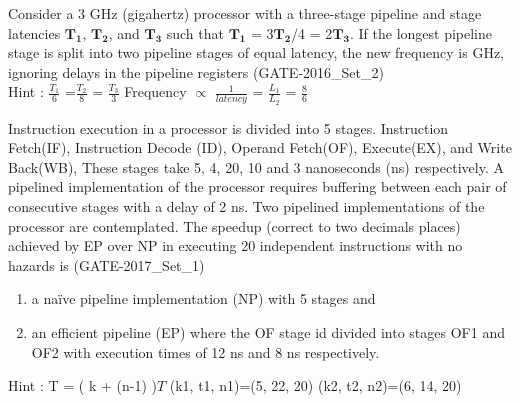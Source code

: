 \begin{questyle}
  \question  Consider a 3 GHz (gigahertz) processor with a three-stage pipeline and stage latencies
             \( \boldsymbol {T_1} \), \( \boldsymbol {T_2} \), and \( \boldsymbol {T_3} \) such that
             \( \boldsymbol {T_1} \) = 3\( \boldsymbol {T_2}\)/4 = 2\( \boldsymbol {T_3} \). If the
             longest pipeline stage is split into two pipeline stages of equal latency, the new frequency
             is \fillin[4] GHz, ignoring delays in the pipeline registers (GATE-2016\_Set\_2)\\

             Hint : {\Large\(\frac{T_1}{6}\)} ={\Large\(\frac{T_2}{8}\)} = {\Large\(\frac{T_3}{3}\)}
             \qquad Frequency \(\propto\) {\Large\(\frac{1}{latency}\)}
              = {\Large\(\frac{L_1}{L_2}\)}
              = {\Large\(\frac{8}{6}\)}
\end{questyle}


\begin{questyle}
  \question  Instruction execution in a processor is divided into 5 stages. Instruction Fetch(IF),
             Instruction Decode (ID), Operand Fetch(OF), Execute(EX), and Write Back(WB), These stages
             take 5, 4, 20, 10 and 3 nanoseconds (ns) respectively. A pipelined implementation of the processor
             requires buffering between each pair of consecutive stages with a delay of 2 ns. Two pipelined
             implementations of the processor are contemplated. The speedup (correct to two decimals places)
             achieved by EP over NP in executing 20 independent instructions with no hazards
             is \fillin[1.508 \(\thickapprox\) 1.50] (GATE-2017\_Set\_1)
             \begin{enumerate}
                  \item a naïve pipeline implementation (NP) with 5 stages and
                  \item an efficient pipeline (EP) where the OF stage id divided into stages
                        OF1 and OF2 with execution times of 12 ns and 8 ns respectively.
              \end{enumerate}
              Hint : T = ( k + (n-1) )\(T\)  \quad (k1, t1, n1)=(5, 22, 20) \qquad (k2, t2, n2)=(6, 14, 20)
\end{questyle}

